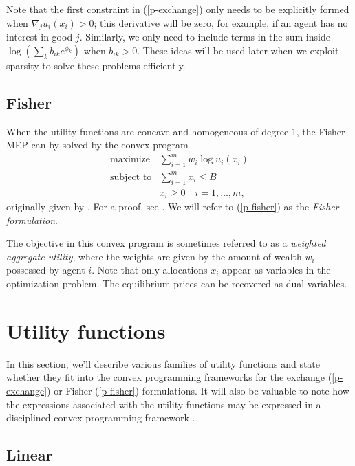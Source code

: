 \documentclass[12pt]{article}
\begin{document}
Note that the first constraint in (\ref{p-exchange}) only needs to be
explicitly formed when $\nabla_j u_i(x_i) > 0$; this derivative will be zero,
for example, if an agent has no interest in good $j$. Similarly, we only need
to include terms in the sum inside $\log(\sum_k b_{ik} e^{\phi_k})$ when
$b_{ik} > 0$. These ideas will be used later when we exploit sparsity to solve
these problems efficiently.

\subsection{Fisher}
\label{sec:convex_form_fisher}

When the utility functions are concave and homogeneous of degree 1,
the Fisher MEP can by solved by the convex program
\begin{equation}
\label{p-fisher}
\begin{array}{ll}
\mbox{maximize} & \sum_{i=1}^m w_i \log u_i(x_i) \\
\mbox{subject to} & \sum_{i=1}^m x_i \leq B\\
& x_i \geq 0\quad i=1,\ldots,m,
\end{array}
\end{equation}
originally given by \cite{eisenberg1959consensus, gale1960theory,
eisenberg1961aggregation}. For a proof, see \cite[\S6.2]{nisan2007algorithmic}.
We will refer to (\ref{p-fisher}) as the \emph{Fisher formulation}.

The objective in this convex program is sometimes referred to as a
\emph{weighted aggregate utility}, where the weights are given by the amount of
wealth $w_i$ possessed by agent $i$. Note that only allocations $x_i$ appear as
variables in the optimization problem. The equilibrium prices can be recovered
as dual variables.

\section{Utility functions}
\label{sec:util_funcs}

In this section, we'll describe various families of utility functions
and state whether they fit into the convex programming frameworks
for the exchange (\ref{p-exchange}) or Fisher (\ref{p-fisher}) formulations.
It will also
be valuable to note how the expressions associated
with the utility functions may be expressed in a disciplined
convex programming framework \cite{GBY:06,Grant2004,cvx,cvxpy}.


\subsection{Linear}
\end{document}

